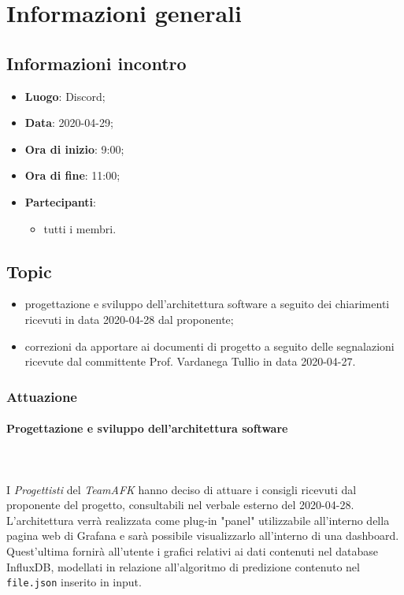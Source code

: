 \section{Informazioni generali}
\subsection{Informazioni incontro}
\begin{itemize}
\item \textbf{Luogo}: Discord;
\item \textbf{Data}: 2020-04-29;
\item \textbf{Ora di inizio}: 9:00;
\item \textbf{Ora di fine}: 11:00;
\item \textbf{Partecipanti}:
	\begin{itemize}
		\item tutti i membri.
	\end{itemize}
\end{itemize}

\subsection{Topic}
\begin{itemize}
\item progettazione e sviluppo dell'architettura software a seguito dei chiarimenti ricevuti in data 2020-04-28 dal proponente;
\item correzioni da apportare ai documenti di progetto a seguito delle segnalazioni ricevute dal committente Prof. Vardanega Tullio in data 2020-04-27.
\end{itemize}

\subsubsection{Attuazione}

\paragraph{Progettazione e sviluppo dell'architettura software} \mbox{} \\ \mbox{} \\
I \textit{Progettisti} del \textit{TeamAFK} hanno deciso di attuare i consigli ricevuti dal proponente del progetto, consultabili nel verbale esterno del 2020-04-28. \\
L'architettura verrà realizzata come plug-in "panel" utilizzabile all'interno della pagina web di Grafana e sarà possibile visualizzarlo all'interno di una dashboard. Quest'ultima fornirà all'utente i grafici relativi ai dati contenuti nel database InfluxDB, modellati in relazione all'algoritmo di predizione contenuto nel \texttt{file.json} inserito in input.

